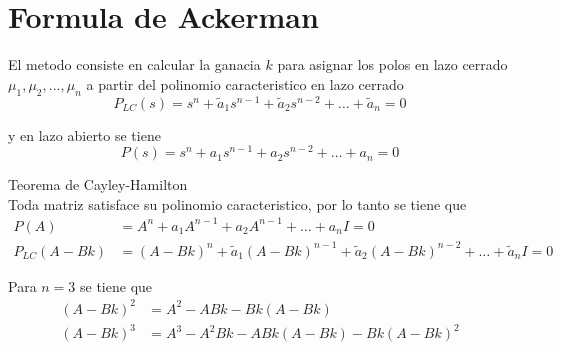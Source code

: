 \section{Formula de Ackerman}

El metodo consiste en calcular la ganacia \( k \) para asignar los polos en lazo cerrado \( \mu_{1}, \mu_{2}, \ldots, \mu_{n} \) a partir del polinomio caracteristico en lazo cerrado
\[
    P_{LC}(s) = s^{n} + \tilde{a}_{1}s^{n-1} + \tilde{a}_{2}s^{n-2} + \ldots + \tilde{a}_{n} = 0 
\]

y en lazo abierto se tiene
\[
    P(s) = s^{n} + a_{1}s^{n-1} + a_{2}s^{n-2} + \ldots + a_{n} = 0
\]

Teorema de Cayley-Hamilton \\
Toda matriz satisface su polinomio caracteristico, por lo tanto se tiene que
\[
    \begin{split}
        P(A) & = A^{n} + a_{1}A^{n-1} + a_{2}A^{n-1} + \ldots + a_{n}I = 0\\
        P_{LC}(A-Bk) & = (A-Bk)^{n} + \tilde{a}_{1}(A-Bk)^{n-1} + \tilde{a}_{2}(A-Bk)^{n-2} + \ldots + \tilde{a}_{n}I = 0
    \end{split}
\]

Para \( n=3 \) se tiene que 
\[
    \begin{split}
        (A-Bk)^{2} & = A^{2} - ABk - Bk(A-Bk)\\
        (A-Bk)^{3} & = A^{3} - A^{2}Bk - ABk(A-Bk) -Bk(A-Bk)^{2}
    \end{split}
\]

